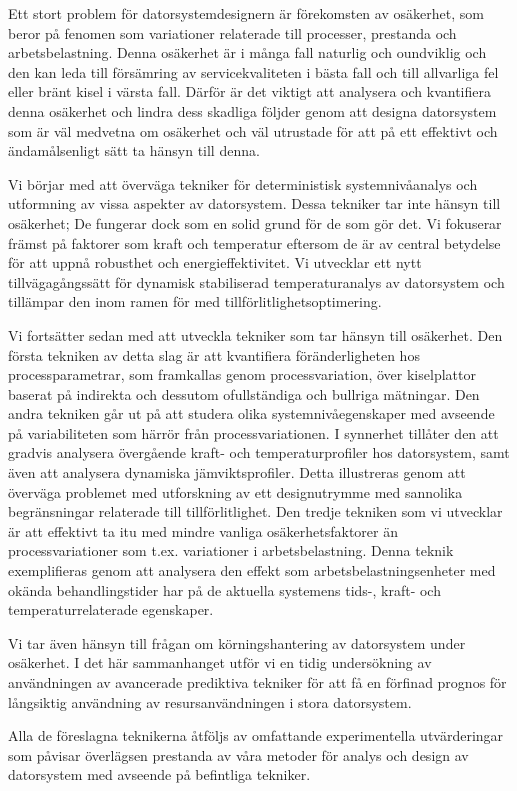 Ett stort problem för datorsystemdesignern är förekomsten av osäkerhet, som
beror på fenomen som variationer relaterade till processer, prestanda och
arbetsbelastning. Denna osäkerhet är i många fall naturlig och oundviklig och
den kan leda till försämring av servicekvaliteten i bästa fall och till
allvarliga fel eller bränt kisel i värsta fall. Därför är det viktigt att
analysera och kvantifiera denna osäkerhet och lindra dess skadliga följder genom
att designa datorsystem som är väl medvetna om osäkerhet och väl utrustade för
att på ett effektivt och ändamålsenligt sätt ta hänsyn till denna.

Vi börjar med att överväga tekniker för deterministisk systemnivåanalys och
utformning av vissa aspekter av datorsystem. Dessa tekniker tar inte hänsyn till
osäkerhet; De fungerar dock som en solid grund för de som gör det. Vi fokuserar
främst på faktorer som kraft och temperatur eftersom de är av central betydelse
för att uppnå robusthet och energieffektivitet. Vi utvecklar ett nytt
tillvägagångssätt för dynamisk stabiliserad temperaturanalys av datorsystem och
tillämpar den inom ramen för med tillförlitlighetsoptimering.

Vi fortsätter sedan med att utveckla tekniker som tar hänsyn till osäkerhet. Den
första tekniken av detta slag är att kvantifiera föränderligheten hos
processparametrar, som framkallas genom processvariation, över kiselplattor
baserat på indirekta och dessutom ofullständiga och bullriga mätningar. Den
andra tekniken går ut på att studera olika systemnivåegenskaper med avseende på
variabiliteten som härrör från processvariationen. I synnerhet tillåter den att
gradvis analysera övergående kraft- och temperaturprofiler hos datorsystem, samt
även att analysera dynamiska jämviktsprofiler. Detta illustreras genom att
överväga problemet med utforskning av ett designutrymme med sannolika
begränsningar relaterade till tillförlitlighet. Den tredje tekniken som vi
utvecklar är att effektivt ta itu med mindre vanliga osäkerhetsfaktorer än
processvariationer som t.ex. variationer i arbetsbelastning. Denna teknik
exemplifieras genom att analysera den effekt som arbetsbelastningsenheter med
okända behandlingstider har på de aktuella systemens tids-, kraft- och
temperaturrelaterade egenskaper.

Vi tar även hänsyn till frågan om körningshantering av datorsystem under
osäkerhet. I det här sammanhanget utför vi en tidig undersökning av användningen
av avancerade prediktiva tekniker för att få en förfinad prognos för långsiktig
användning av resursanvändningen i stora datorsystem.

Alla de föreslagna teknikerna åtföljs av omfattande experimentella utvärderingar
som påvisar överlägsen prestanda av våra metoder för analys och design av
datorsystem med avseende på befintliga tekniker.

